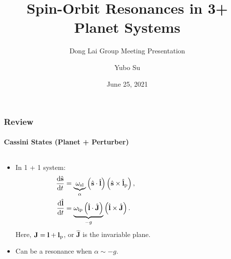 \documentclass[dvipsnames]{beamer}
\newcommand*{\rd}[2]{\frac{\mathrm{d}#1}{\mathrm{d}#2}}
\newcommand*{\bm}[1]{\boldsymbol{\mathbf{#1}}}
\newcommand*{\uv}[1]{\hat{\bm{#1}}}
\newcommand*{\p}[1]{\left(#1\right)}
\begin{document}
\title{Spin-Orbit Resonances in 3+ Planet Systems}
\subtitle{Dong Lai Group Meeting Presentation}
\author{Yubo Su}
\date{June 25, 2021}

\maketitle

\begin{frame}
    \frametitle{Review}
    \framesubtitle{Cassini States (Planet + Perturber)}

    \begin{columns}
        \begin{column}{0.5\columnwidth}
            \begin{itemize}
                \item In 1 + 1 system:
                    \begin{align*}
                        \rd{\uv{s}}{t} &= \underbrace{\omega_{\rm sl}}_\alpha
                            \p{\uv{s} \cdot \uv{l}}
                            \p{\uv{s} \times \uv{l}_{\rm p}},\\
                        \rd{\uv{l}}{t}
                            &= \underbrace{\omega_{\rm lp}
                                \p{\uv{l} \cdot \uv{J}}}_{-g}
                                \p{\uv{l} \times \uv{J}}.
                    \end{align*}
                    Here, $\bm{J} = \bm{l} + \bm{l}_{\rm p}$, or $\uv{J}$ is the
                    invariable plane.

                \item Can be a resonance when $\alpha \sim -g$.
            \end{itemize}
        \end{column}
        \begin{column}{0.5\columnwidth}
            \begin{figure}
                \centering
            \end{figure}
        \end{column}
    \end{columns}
\end{frame}
\end{document}
